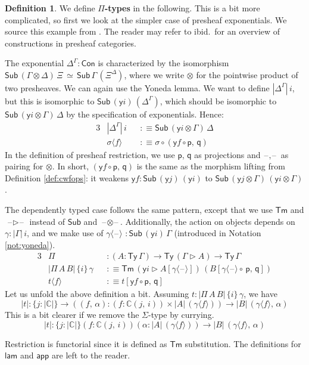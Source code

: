 \documentclass[12pt,a4paper,twoside,openany]{book}
\theoremstyle{remark}
\theoremstyle{definition}
\newtheorem{mydefinition}{Definition}
\theoremstyle{theorem}
\newcommand{\ms}[1]{\mathsf{#1}}
\newcommand{\mbb}[1]{\mathbb{#1}}
\newcommand{\Con}{\mathsf{Con}}
\newcommand{\Sub}{\mathsf{Sub}}
\newcommand{\Tm}{\mathsf{Tm}}
\newcommand{\Ty}{\mathsf{Ty}}
\newcommand{\blank}{\mathord{\hspace{1pt}\text{--}\hspace{1pt}}}
\newcommand{\ext}{\triangleright}
\newcommand{\p}{\mathsf{p}}
\newcommand{\q}{\mathsf{q}}
\newcommand{\app}{\ms{app}}
\newcommand{\mbbC}{\mbb{C}}
\newcommand{\lam}{\ms{lam}}
\newcommand{\lab}{\langle}
\newcommand{\rab}{\rangle}
\newcommand{\defn}{:\equiv}
\newcommand{\yon}{\ms{y}}
\begin{document}
\begin{mydefinition}
We define \textbf{$\Pi$-types} in the following. This is a bit more complicated,
so first we look at the simpler case of presheaf exponentials. We source this
example from \cite[Section~I.]{maclane2012sheaves}. The reader may refer to
ibid.\ for an overview of constructions in presheaf categories.

The exponential $\Delta^\Gamma : \Con$ is characterized by the isomorphism
$\Sub\,(\Gamma \otimes \Delta)\,\Xi\,\simeq\,\Sub\,\Gamma\,(\Xi^\Delta)$, where
we write $\otimes$ for the pointwise product of two presheaves. We can again use
the Yoneda lemma. We want to define $|\Delta^\Gamma|\,i$, but this is isomorphic
to $\Sub\,(\yon i)\,(\Delta^\Gamma)$, which should be isomorphic to $\Sub\,(\yon
i \otimes \Gamma)\,\Delta$ by the specification of exponentials. Hence:
\begin{alignat*}{3}
  &|\Delta^\Gamma|\,i &&\defn \Sub\,(\yon i \otimes \Gamma)\,\Delta \\
  & \sigma \lab f \rab &&\defn \sigma \circ (\yon f \circ \p,\,\q)
\end{alignat*}
In the definition of presheaf restriction, we use $\p$, $\q$ as projections and
$\blank\!,\!\blank$ as pairing for $\otimes$. In short, $(\yon f \circ \p,\,\q)$
is the same as the morphism lifting from Definition \ref{def:cwfops}: it weakens
$\yon f : \Sub\,(\yon j)\,(\yon i)$ to $\Sub\,(\yon j \otimes \Gamma)\,(\yon i
\otimes \Gamma)$.

The dependently typed case follows the same pattern, except that we use $\Tm$
and $\blank\!\ext\!\blank$ instead of $\Sub$ and
$\blank\!\otimes\!\blank$. Additionally, the action on objects depends on
$\gamma : |\Gamma|\,i$, and we make use of $\gamma \lab \blank \rab\,\,:
\Sub\,(\yon i)\,\Gamma$ (introduced in Notation \ref{not:yoneda}).
\begin{alignat*}{3}
  & \Pi &&: (A : \Ty\,\Gamma) \to \Ty\,(\Gamma \ext A) \to \Ty\,\Gamma\\
  & |\Pi\,A\,B|\,\{i\}\,\gamma &&\defn \Tm\,(\yon i \ext A[\gamma \lab \blank \rab])\,(B[\gamma\lab\blank\rab \circ\,\p,\,\q])\\
  & t\lab f \rab &&\defn t[\yon f \circ \p,\, \q]
\end{alignat*}
Let us unfold the above definition a bit. Assuming $t : |\Pi\,A\,B|\,\{i\}\,\gamma$, we have
\[
|t| : \{j : |\mbbC|\}\to((f,\,\alpha) : (f : \mbbC(j,\,i)) \times |A|\,(\gamma\lab f \rab)) \to
       |B|\,(\gamma\lab f\rab,\,\alpha)
\]
This is a bit clearer if we remove the $\Sigma$-type by currying.
\[
|t| : \{j : |\mbbC|\}(f : \mbbC(j,\,i))(\alpha : |A|\,(\gamma \lab f \rab)) \to
       |B|\,(\gamma\lab f \rab,\,\alpha)
\]

Restriction is functorial since it is defined as $\Tm$ substitution. The definitions
for $\lam$ and $\app$ are left to the reader.
\end{mydefinition}
\end{document}
